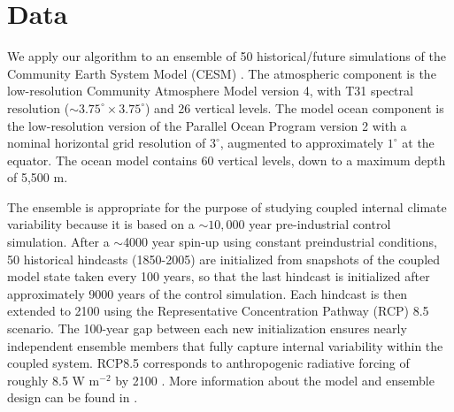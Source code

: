 \documentclass{ametsoc}
\begin{document}



\section{Data}
\label{sec:data}

We apply our algorithm to an ensemble of 50 historical/future simulations of the Community Earth System Model (CESM) \citep{sriver2015effects}.  The atmospheric component is the low-resolution Community Atmosphere Model version 4, with T31 spectral resolution (${\sim}3.75^\circ \times 3.75^\circ$) and 26 vertical levels. The model ocean component is the low-resolution version of the Parallel Ocean Program version 2 \citep{smith2010parallel} with a nominal horizontal grid resolution of $3^\circ$, augmented to approximately $1^\circ$ at the equator. The ocean model contains 60 vertical levels, down to a maximum depth of 5,500 m. 

The ensemble is appropriate for the purpose of studying coupled internal climate variability because it is based on a ${\sim}10{,}000$ year pre-industrial control simulation. After a $\sim$4000 year spin-up using constant preindustrial conditions, 50 historical hindcasts (1850-2005) are initialized from snapshots of the coupled model state taken every 100 years, so that the last hindcast is initialized after approximately 9000 years of the control simulation. Each hindcast is then extended to 2100 using the Representative Concentration Pathway (RCP) 8.5 scenario. The 100-year gap between each new initialization ensures nearly independent ensemble members that fully capture internal variability within the coupled system. RCP8.5 corresponds to anthropogenic radiative forcing of roughly 8.5 W m$^{-2}$ by 2100 \citep{moss2010next}. More information about the model and ensemble design can be found in \citet{sriver2015effects, hogan2017analyzing, vega2017analysis}.
\end{document}
